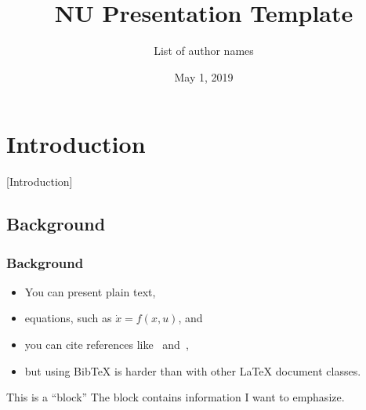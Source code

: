 \documentclass[aspectratio=169,9pt,xcolor=dvipsnames]{beamer}
\title[Presentation]{NU Presentation Template} %
\author[A. Uthor]{List of author names} %
\institute[NU] %
{
Northwestern University \\ %
\medskip
\textit{author@institution.edu} %
}
\date{May 1, 2019} %
\begin{document}
\begin{frame}
\titlepage %
\end{frame}




\section{Introduction}[Introduction] %
\subsection{Background}
\begin{frame}
\frametitle{Background}

\begin{itemize}
\item You can present plain text,
\item equations, such as $\dot{x} = f\left(x,u\right)$, and
\item you can cite references like~\cite{Aguilar} and~\cite{Hubicki},
\item but using BibTeX is harder than with other LaTeX document classes.
\end{itemize}


\begin{block}{This is a ``block''}
The block contains information I want to emphasize.
\end{block}
\end{frame}
\end{document}
